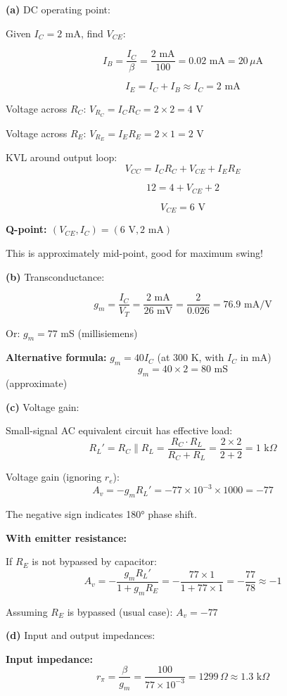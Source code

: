 \documentclass[12pt,a4paper]{article}
\begin{document}
\begin{solution}
\textbf{(a)} DC operating point:

Given $I_C = 2$ mA, find $V_{CE}$:

$$I_B = \frac{I_C}{\beta} = \frac{2\text{ mA}}{100} = 0.02\text{ mA} = 20\,\mu\text{A}$$

$$I_E = I_C + I_B \approx I_C = 2\text{ mA}$$

Voltage across $R_C$: $V_{R_C} = I_C R_C = 2 \times 2 = 4$ V

Voltage across $R_E$: $V_{R_E} = I_E R_E = 2 \times 1 = 2$ V

KVL around output loop:
$$V_{CC} = I_C R_C + V_{CE} + I_E R_E$$

$$12 = 4 + V_{CE} + 2$$

$$V_{CE} = 6\text{ V}$$

\textbf{Q-point: $(V_{CE}, I_C) = (6\text{ V}, 2\text{ mA})$}

This is approximately mid-point, good for maximum swing!

\textbf{(b)} Transconductance:

$$g_m = \frac{I_C}{V_T} = \frac{2\text{ mA}}{26\text{ mV}} = \frac{2}{0.026} = 76.9\text{ mA/V}$$

Or: $g_m = 77$ mS (millisiemens)

\textbf{Alternative formula:} $g_m = 40 I_C$ (at 300 K, with $I_C$ in mA)
$$g_m = 40 \times 2 = 80\text{ mS}$$ (approximate)

\textbf{(c)} Voltage gain:

Small-signal AC equivalent circuit has effective load:
$$R_L' = R_C \parallel R_L = \frac{R_C \cdot R_L}{R_C + R_L} = \frac{2 \times 2}{2 + 2} = 1\text{ k}\Omega$$

Voltage gain (ignoring $r_e$):
$$A_v = -g_m R_L' = -77 \times 10^{-3} \times 1000 = -77$$

The negative sign indicates 180° phase shift.

\textbf{With emitter resistance:}

If $R_E$ is not bypassed by capacitor:
$$A_v = -\frac{g_m R_L'}{1 + g_m R_E} = -\frac{77 \times 1}{1 + 77 \times 1} = -\frac{77}{78} \approx -1$$

Assuming $R_E$ is bypassed (usual case): $A_v = -77$

\textbf{(d)} Input and output impedances:

\textbf{Input impedance:}
$$r_{\pi} = \frac{\beta}{g_m} = \frac{100}{77 \times 10^{-3}} = 1299\,\Omega \approx 1.3\text{ k}\Omega$$


\end{solution}
\end{document}
